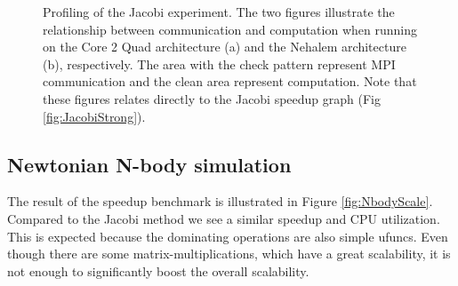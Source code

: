 \documentclass{sigplanconf}
\begin{document}
\begin{figure}[t]%
  \begin{center}%
    \caption{Profiling of the Jacobi experiment. The two figures illustrate the relationship between communication and computation when running on the Core 2 Quad architecture (a) and the Nehalem architecture (b), respectively. The area with the check pattern represent MPI communication and the clean area represent computation. Note that these figures relates directly to the Jacobi speedup graph (Fig \ref{fig:JacobiStrong}).}
    \label{fig:JacobiProfiling}%
  \end{center}
\end{figure}


\subsection{Newtonian N-body simulation}
The result of the speedup benchmark is illustrated in Figure \ref{fig:NbodyScale}. Compared to the Jacobi method we see a similar speedup and CPU utilization. This is expected because the dominating operations are also simple ufuncs. Even though there are some matrix-multiplications, which have a great scalability, it is not enough to significantly boost the overall scalability.
\end{document}
